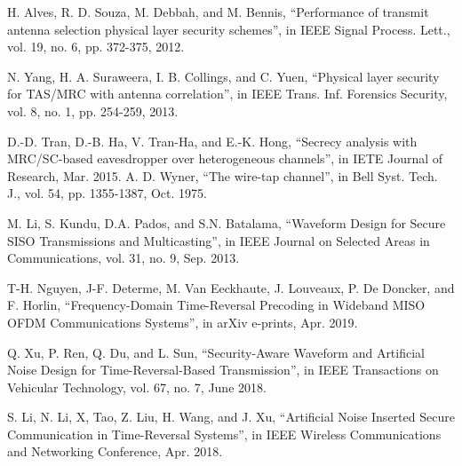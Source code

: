 \documentclass[conference]{IEEEtran}
\begin{document}

\begin{thebibliography}{00}
 
 
 
 
 
 H. Alves, R. D. Souza, M. Debbah, and M. Bennis, ``Performance of transmit antenna selection physical layer security schemes'', in IEEE Signal Process. Lett., vol. 19, no. 6, pp. 372-375, 2012.


 N. Yang, H. A. Suraweera, I. B. Collings, and C. Yuen, ``Physical layer security for TAS/MRC with antenna correlation'', in IEEE Trans. Inf. Forensics Security, vol. 8, no. 1, pp. 254-259, 2013.

D.-D. Tran, D.-B. Ha, V. Tran-Ha, and E.-K. Hong, ``Secrecy analysis with MRC/SC-based eavesdropper over heterogeneous channels'', in IETE Journal of Research, Mar. 2015. 
 A. D. Wyner, ``The wire-tap channel'', in Bell Syst. Tech. J., vol. 54, pp. 1355-1387, Oct. 1975.


 M. Li, S. Kundu, D.A. Pados, and S.N. Batalama, ``Waveform Design for Secure SISO Transmissions and Multicasting'', in IEEE Journal on Selected Areas in Communications, vol. 31, no. 9, Sep. 2013.

 T-H. Nguyen, J-F. Determe, M. Van Eeckhaute, J. Louveaux, P. De Doncker, and F. Horlin, ``Frequency-Domain Time-Reversal Precoding in Wideband MISO OFDM Communications Systems'', in arXiv e-prints, Apr. 2019.

 Q. Xu, P. Ren, Q. Du, and L. Sun, ``Security-Aware Waveform and Artificial Noise Design for Time-Reversal-Based Transmission'', in IEEE Transactions on Vehicular Technology, vol. 67, no. 7, June 2018.

 S. Li, N. Li, X, Tao, Z. Liu, H. Wang, and J. Xu, ``Artificial Noise Inserted Secure Communication in Time-Reversal Systems'', in IEEE Wireless Communications and Networking Conference, Apr. 2018.


\end{thebibliography}
\end{document}
